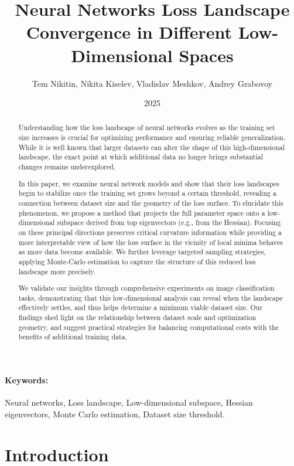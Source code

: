 \documentclass[12pt]{article}
\title{Neural Networks Loss Landscape Convergence in Different Low-Dimensional Spaces}
\author{Tem Nikitin, Nikita Kiselev, Vladislav Meshkov, Andrey Grabovoy}
\date{2025}
\begin{document}
\maketitle

\begin{abstract}
    Understanding how the loss landscape of neural networks evolves as the training set size increases is crucial for
    optimizing performance and ensuring reliable generalization. While it is well known that larger datasets can alter
    the shape of this high-dimensional landscape, the exact point at which additional data no longer brings substantial
    changes remains underexplored.

    In this paper, we examine neural network models and show that their loss landscapes begin to stabilize once the
    training set grows beyond a certain threshold, revealing a connection between dataset size and the geometry of the
    loss surface. To elucidate this phenomenon, we propose a method that projects the full parameter space onto a
    low-dimensional subspace derived from top eigenvectors (e.g., from the Hessian). Focusing on these principal directions
    preserves critical curvature information while providing a more interpretable view of how the loss surface in the
    vicinity of local minima behaves as more data become available. We further leverage targeted sampling strategies,
    applying Monte-Carlo estimation to capture the structure of this reduced loss landscape more precisely.

    We validate our insights through comprehensive experiments on image classification tasks, demonstrating that this
    low-dimensional analysis can reveal when the landscape effectively settles, and thus helps determine a minimum viable
    dataset size. Our findings shed light on the relationship between dataset scale and optimization geometry, and suggest
    practical strategies for balancing computational costs with the benefits of additional training data.
\end{abstract}
\paragraph{Keywords:} 
Neural networks, Loss landscape, Low-dimensional subspace, Hessian eigenvectors, Monte Carlo estimation, Dataset size threshold.

\section{Introduction}



\end{document}
